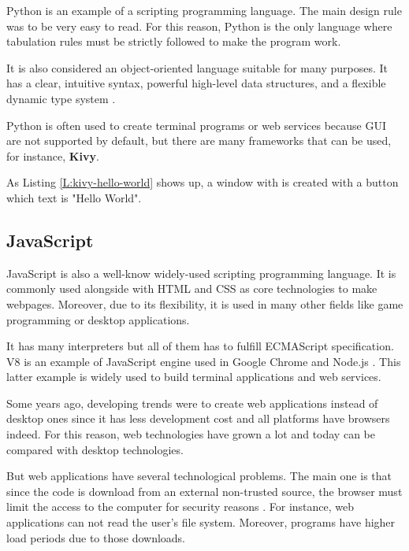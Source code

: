Python is an example of a scripting programming language. The main design rule
was to be very easy to read. For this reason, Python is the only language where
tabulation rules must be strictly followed to make the program work.

It is also considered an object-oriented language suitable for many purposes.
It has a clear, intuitive syntax, powerful high-level data structures, and a
flexible dynamic type system \cite{An93pythonfor}.

Python is often used to create terminal programs or web services because GUI
are not supported by default, but there are many frameworks that can be used,
for instance, \textbf{Kivy}.

\begin{codefigure}
\end{codefigure}

As Listing \ref{L:kivy-hello-world} shows up, a window with is created with a
button which text is "Hello World".

\subsection{JavaScript}

JavaScript is also a well-know widely-used scripting programming language. It is commonly used
alongside with HTML and CSS as core technologies to make webpages. Moreover, due
to its flexibility, it is used in many other fields like game programming or
desktop applications.

It has many interpreters but all of them has to fulfill ECMAScript
specification. V8 is an example of JavaScript engine used in Google Chrome and
Node.js \cite{nodejs-web}. This latter example is widely used to build terminal
applications and web services.

Some years ago, developing trends were to create web applications instead of
desktop ones since it has less development cost and all platforms have browsers
indeed. For this reason, web technologies have grown a lot and today can be
compared with desktop technologies.

But web applications have several technological problems. The main one is that
since the code is download from an external non-trusted source, the browser
must limit the access to the computer for security reasons
\cite{securing-your-browser}. For instance, web applications can not read the
user's file system. Moreover, programs have higher load periods due to those
downloads.

